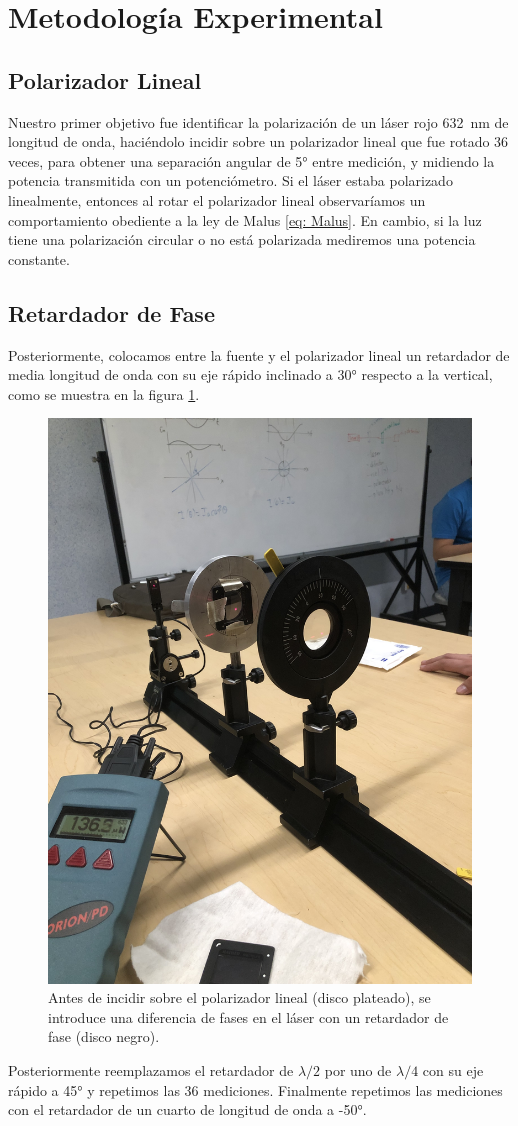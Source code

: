 \section{Metodología Experimental}
\subsection{Polarizador Lineal}
Nuestro primer objetivo fue identificar la polarización de un láser rojo \qty{632}{\nm} de longitud de onda, haciéndolo incidir sobre un polarizador lineal que fue rotado 36 veces, para obtener una separación angular de \ang{5} entre medición, y midiendo la potencia transmitida con un potenciómetro.
Si el láser estaba polarizado linealmente, entonces al rotar el polarizador lineal observaríamos un comportamiento obediente a la ley de Malus \eqref{eq: Malus}. En cambio, si la luz tiene una polarización circular o no está polarizada mediremos una potencia constante.

\subsection{Retardador de Fase}

Posteriormente, colocamos entre la fuente y el polarizador lineal un retardador de media longitud de onda con su eje rápido inclinado a \ang{30} respecto a la vertical, como se muestra en la figura \ref{fig: labo}.
\begin{figure}[H]
    \centering
    \includegraphics[width=0.9\linewidth, angle=-90]{Imagenes/labo.jpeg}
    \caption{Antes de incidir sobre el polarizador lineal (disco plateado), se introduce una diferencia de fases en el láser con un retardador de fase (disco negro).}
    \label{fig: labo}
\end{figure}

Posteriormente reemplazamos el retardador de $\lambda/2$ por uno de $\lambda/4$ con su eje rápido a \ang{45} y repetimos las 36 mediciones. Finalmente repetimos las mediciones con el retardador de un cuarto de longitud de onda a \ang{-50}.